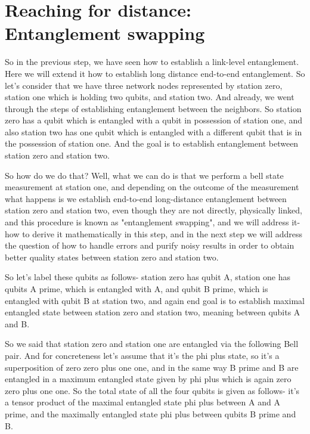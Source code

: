 \section{Reaching for distance: Entanglement swapping}


So in the previous step, we have seen how to establish a link-level entanglement. Here we will extend it how to establish long distance end-to-end entanglement. So let's consider that we have three network nodes represented by station zero, station one which is holding two qubits, and station two. And already, we went through the steps of establishing entanglement between the neighbors. So station zero has a qubit which is entangled with a qubit in possession of station one, and also station two has one qubit which is entangled with a different qubit that is in the possession of station one. And the goal is to establish entanglement between station zero and station two.

So how do we do that? Well, what we can do is that we perform a bell state measurement at station one, and depending on the outcome of the measurement what happens is we establish end-to-end long-distance entanglement between station zero and station two, even though they are not directly, physically linked, and this procedure is known as "entanglement swapping", and we will address it- how to derive it mathematically in this step, and in the next step we will address the question of how to handle errors and purify noisy results in order to obtain better quality states between station zero and station two.

So let's label these qubits as follows- station zero has qubit A, station one has qubits A prime, which is entangled with A, and qubit B prime, which is entangled with qubit B at station two, and again end goal is to establish maximal entangled state between station zero and station two, meaning between qubits A and B.

So we said that station zero and station one are entangled via the following Bell pair. And for concreteness let's assume that it's the phi plus state, so it's a superposition of zero zero plus one one, and in the same way B prime and B are entangled in a maximum entangled state given by phi plus which is again zero zero plus one one. So the total state of all the four qubits is given as follows- it's a tensor product of the maximal entangled state phi plus between A and A prime, and the maximally entangled state phi plus between qubits B prime and B.

